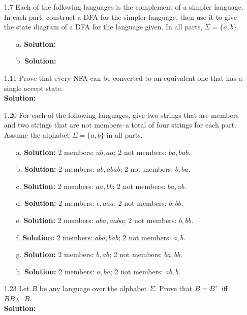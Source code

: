 \begin{enumerate}
\item[1.7]Each of the following languages is the complement of a simpler language. In each part, construct a DFA for the simpler language, then use it to give the state diagram of a DFA for the language given. In all parts, $\Sigma = \{a, b\}$.
\begin{enumerate}
\item[a.]\textbf{Solution:} \alreadyanswered
\item[b.]\textbf{Solution:} \alreadyanswered
\end{enumerate}

\item[1.11]Prove that every NFA can be converted to an equivalent one that has a single accept state.
\\
\textbf{Solution:} \alreadyanswered

\item[1.20]For each of the following languages, give two strings that are members and two strings that are not members--a total of four strings for each part. Assume the alphabet $\Sigma = \{a,b\}$ in all parts.
\begin{enumerate}
\item[a.]\textbf{Solution:} 2 members: $ab, aa$; 2 not members: $ba, bab$.
\item[b.]\textbf{Solution:} 2 members: $ab, abab$; 2 not members: $b, ba$.
\item[c.]\textbf{Solution:} 2 members: $aa, bb$; 2 not members: $ba, ab$.
\item[d.]\textbf{Solution:} 2 members: $\epsilon, aaa$; 2 not members: $b, bb$.
\item[e.]\textbf{Solution:} 2 members: $aba, aaba$; 2 not members: $b, bb$.
\item[f.]\textbf{Solution:} 2 members: $aba, bab$; 2 not members: $a, b$.
\item[g.]\textbf{Solution:} 2 members: $b, ab$; 2 not members: $ba, bb$.
\item[h.]\textbf{Solution:} 2 members: $a, ba$; 2 not members: $ab, b$.
\end{enumerate}

\item[1.23]Let $B$ be any language over the alphabet $\Sigma$. Prove that $B = B^+$ iff $BB \subseteq B$.
\\
\textbf{Solution:} \alreadyanswered


\end{enumerate}
